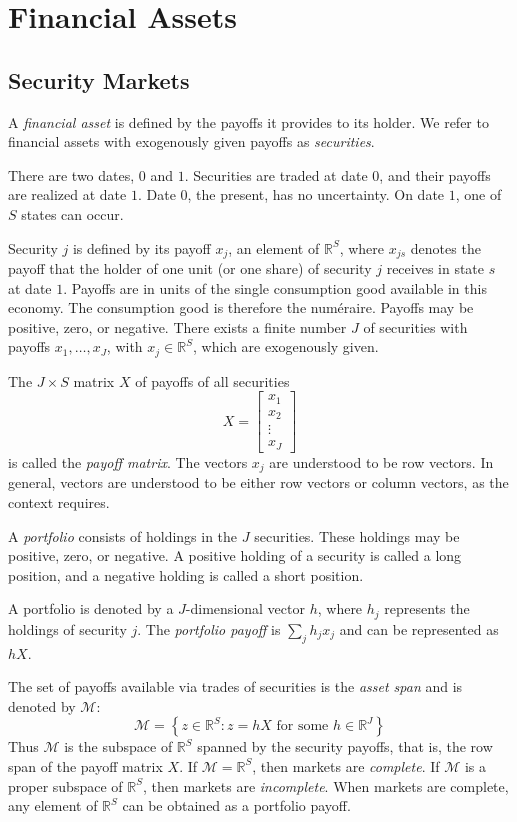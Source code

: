 \documentclass[\topdir/lecture\_notes.tex]{subfiles}
\begin{document}
\section{Financial Assets}
\subsection{Security Markets}
A \emph{financial asset} is defined by the payoffs it provides to its holder. We refer to financial assets with exogenously given payoffs as \emph{securities}.

There are two dates, $0$ and $1$. Securities are traded at date $0$, and their payoffs are realized at date $1$. Date $0$, the present, has no uncertainty. On date $1$, one of $S$ states can occur.

Security $j$ is defined by its payoff $x_{j}$, an element of $\mathbb{R}^{S}$, where $x_{js}$ denotes the payoff that the holder of one unit (or one share) of security $j$ receives in state $s$ at date $1$.  Payoffs are in units of the single consumption good available in this economy. The consumption good is therefore the num\'eraire. Payoffs may be positive, zero, or negative. There exists a finite number $J$ of securities with payoffs $x_{1}, \ldots, x_{J}$, with $x_{j} \in \mathbb{R}^{S}$, which are exogenously given.

The $J \times S$ matrix $X$ of payoffs of all securities
\[
X=\left[\begin{array}{c}
x_{1} \\
x_{2} \\
\vdots \\
x_{J}
\end{array}\right]
\]
is called the \emph{payoff matrix}. The vectors $x_{j}$ are understood to be row vectors. In general, vectors are understood to be either row vectors or column vectors, as the context requires.

A \emph{portfolio} consists of holdings in the $J$ securities. These holdings may be positive, zero, or negative. A positive holding of a security  is called a long position, and a negative holding is called a short position.

A portfolio is denoted by a $J$-dimensional vector $h$, where $h_{j}$ represents the holdings of security $j$. The \emph{portfolio payoff} is $\sum_{j} h_{j} x_{j}$ and can be represented as $h X$.

The set of payoffs available via trades of securities is the \emph{asset span} and is denoted by $\mathcal{M}$:
\begin{equation*}
\mathcal{M}=\left\{z \in \mathbb{R}^{S} \colon z=h X \text { for some } h \in \mathbb{R}^{J}\right\} 
\end{equation*}
Thus $\mathcal{M}$ is the subspace of $\mathbb{R}^{S}$ spanned by the security payoffs, that is, the row span of the payoff matrix $X$. If $\mathcal{M}=\mathbb{R}^{S}$, then markets are \emph{complete}. If $\mathcal{M}$ is a proper subspace of $\mathbb{R}^{S}$, then markets are \emph{incomplete}. When markets are complete, any element of $\mathbb{R}^{S}$ can be obtained as a portfolio payoff.
\end{document}
